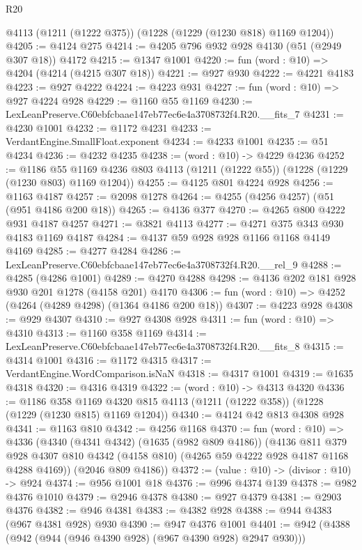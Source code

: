 \begin{lexlean}{R20}
\begin{coremodule}
    @4113
    (@1211 (@1222 @375))
    (@1228 (@1229 (@1230 @818) @1169 @1204))
@4205 := @4124 @275
@4214 := @4205 @796 @932 @928 @4130 (@51 (@2949 @307 @18)) @4172
@4215 := @1347 @1001
@4220 := fun (word : @10) => @4204 (@4214 (@4215 @307 @18))
@4221 := @927 @930
@4222 := @4221 @4183
@4223 := @927 @4222
@4224 := @4223 @931
@4227 := fun (word : @10) => @927 @4224 @928
@4229 := @1160 @55 @1169
@4230 := LexLeanPreserve.C60ebfcbaae147eb77ec6e4a3708732f4.R20.__fits_7
@4231 := @4230 @1001
@4232 := @1172 @4231
@4233 := VerdantEngine.SmallFloat.exponent
@4234 := @4233 @1001
@4235 := @51 @4234
@4236 := @4232 @4235
@4238 := (word : @10) -> @4229 @4236
@4252 := @1186
    @55
    @1169
    @4236
    @803
    @4113
    (@1211 (@1222 @55))
    (@1228 (@1229 (@1230 @803) @1169 @1204))
@4255 := @4125 @801 @4224 @928
@4256 := @1163 @4187
@4257 := @2098 @1278
@4264 := @4255 (@4256 @4257) (@51 (@951 @4186 @200 @18))
@4265 := @4136 @377
@4270 := @4265 @800 @4222 @931 @4187 @4257
@4271 := @3821 @4113
@4277 := @4271 @375 @343 @930 @4183 @1169 @4187
@4284 := @4137 @59 @928 @928 @1166 @1168 @4149 @4169
@4285 := @4277 @4284
@4286 := LexLeanPreserve.C60ebfcbaae147eb77ec6e4a3708732f4.R20.__rel_9
@4288 := @4285 (@4286 @1001)
@4289 := @4270 @4288
@4298 := @4136 @202 @181 @928 @930 @201 @1278 (@4158 @201) @4170
@4306 := fun (word : @10) => @4252 (@4264 (@4289 @4298) (@1364 @4186 @200 @18))
@4307 := @4223 @928
@4308 := @929 @4307
@4310 := @927 @4308 @928
@4311 := fun (word : @10) => @4310
@4313 := @1160 @358 @1169
@4314 := LexLeanPreserve.C60ebfcbaae147eb77ec6e4a3708732f4.R20.__fits_8
@4315 := @4314 @1001
@4316 := @1172 @4315
@4317 := VerdantEngine.WordComparison.isNaN
@4318 := @4317 @1001
@4319 := @1635 @4318
@4320 := @4316 @4319
@4322 := (word : @10) -> @4313 @4320
@4336 := @1186
    @358
    @1169
    @4320
    @815
    @4113
    (@1211 (@1222 @358))
    (@1228 (@1229 (@1230 @815) @1169 @1204))
@4340 := @4124 @42 @813 @4308 @928
@4341 := @1163 @810
@4342 := @4256 @1168
@4370 := fun (word : @10) =>
  @4336
    (@4340
      (@4341 @4342)
      (@1635 (@982 @809 @4186))
      (@4136
        @811
        @379
        @928
        @4307
        @810
        @4342
        (@4158 @810)
        (@4265 @59 @4222 @928 @4187 @1168 @4288 @4169))
      (@2046 @809 @4186))
@4372 := (value : @10) -> (divisor : @10) -> @924
@4374 := @956 @1001 @18
@4376 := @996 @4374 @139
@4378 := @982 @4376 @1010
@4379 := @2946 @4378
@4380 := @927 @4379
@4381 := @2903 @4376
@4382 := @946 @4381
@4383 := @4382 @928
@4388 := @944 @4383 (@967 @4381 @928) @930
@4390 := @947 @4376 @1001
@4401 := @942 (@4388 (@942 (@944 (@946 @4390 @928) (@967 @4390 @928) @2947 @930)))

\end{coremodule}
\end{lexlean}
